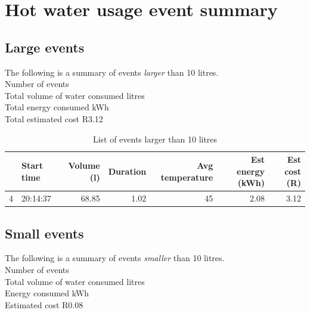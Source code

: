 \documentclass{article}\usepackage[]{graphicx}\usepackage[]{color}
\newenvironment{knitrout}{}{} %
\begin{document}
\newpage
\section{Hot water usage event summary}



\subsection{Large events}

The following is a summary of events \textit{larger} than 10 litres. \\

Number of events \\
Total volume of water consumed  litres\\
Total energy consumed  kWh\\
Total estimated cost \dotfill R3.12\\

\begin{center}
\begin{table}[h!]
\begin{knitrout}
\color{fgcolor}
\begin{tabular}{l|l|r|r|r|r|r}
\hline
  & Start time & Volume (l) & Duration & Avg temperature & Est energy (kWh) & Est cost (R)\\
\hline
4 & 20:14:37 & 68.85 & 1.02 & 45 & 2.08 & 3.12\\
\hline
\end{tabular}


\end{knitrout}
\caption{List of events larger than 10 litres}
\end{table}
\end{center}


\subsection{Small events}

The following is a summary of events \textit{smaller} than 10 litres. \\

Number of events \\
Total volume of water consumed  litres\\
Energy consumed  kWh\\
Estimated cost \dotfill R0.08\\
\end{document}
